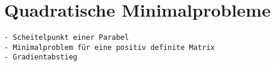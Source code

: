 %
%
%
\section{Quadratische Minimalprobleme
\label{buch:fuvar:section:quadratisch}}

\begin{verbatim}
- Scheitelpunkt einer Parabel
- Minimalproblem für eine positiv definite Matrix
- Gradientabstieg
\end{verbatim}

